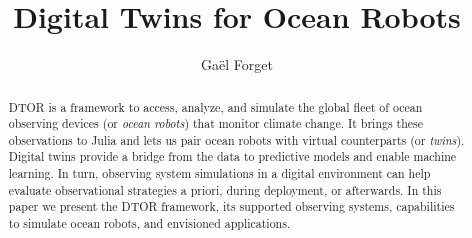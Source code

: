 \documentclass{juliacon}[12pt]
\begin{document}
\title{Digital Twins for Ocean Robots}

\author[1]{Gaël Forget}



\maketitle

\begin{abstract}

DTOR is a framework to access, analyze, and simulate the global fleet of ocean observing devices (or {\it ocean robots}) that monitor climate change. It brings these observations to Julia and lets us pair ocean robots with virtual counterparts (or {\it twins}). Digital twins provide a bridge from the data to predictive models and enable machine learning. In turn, observing system simulations in a digital environment can help evaluate observational strategies a priori, during deployment, or afterwards. In this paper we present the DTOR framework, its supported observing systems, capabilities to simulate ocean robots, and envisioned applications. 


\end{abstract}
\end{document}
